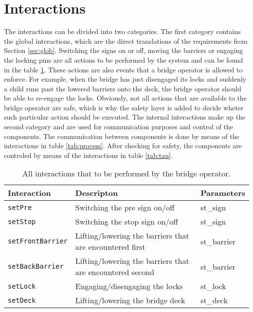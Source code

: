 \section{Interactions}
\label{sec:act}


The interactions can be divided into two categories. The first category contains the global interactions, which are the direct translations of the requirements from Section \ref{sec:glob}.
Switching the signs on or off, moving the barriers or engaging the locking pins are all actions to be performed by the system and can be found in the table \ref{tab:glob}. These actions are also events that a bridge operator is allowed to enforce. For example, when the bridge has just disengaged its locks and suddenly a child runs past the lowered barriers onto the deck, the bridge operator should be able to re-engage the locks. Obviously, not all actions that are available to the bridge operator are safe, which is why the safety layer is added to decide wheter such particular action should be executed.
The internal interactions make up the second category and are used for communication purposes and control of the components. The communication between components is done by means of the interactions in table \ref{tab:process}. After checking for safety, the components are controled by means of the interactions in table \ref{tab:tau}.
%
\begin{table}[htb]%
\begin{tabular}{lll}
			\textbf{Interaction} &	\textbf{Descripton}	&	\textbf{Parameters}\\
  		\hline
  		\texttt{setPre} & Switching the pre sign on/off & st\_sign\\
      \texttt{setStop} & Switching the stop sign on/off & st\_sign\\
      \texttt{setFrontBarrier} & Lifting/lowering the barriers that are encountered first & st\_barrier\\
			\texttt{setBackBarrier} & Lifting/lowering the barriers that are encountered second & st\_barrier\\
      \texttt{setLock} & Engaging/disengaging the locks & st\_lock\\
      \texttt{setDeck} & Lifting/lowering the bridge deck & st\_deck\\
\end{tabular}
\caption{All interactions that to be performed by the bridge operator.}
\label{tab:glob}
\end{table}
%
